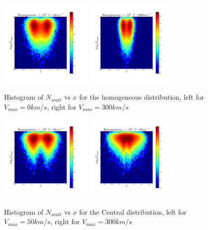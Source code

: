 \documentclass[usenatbib]{mn2e}
\begin{document}
\begin{figure}
     \includegraphics[width=0.40\textwidth]{2dHistogram0t5HOM.png}
     \includegraphics[width=0.40\textwidth]{2dHistogram300t5HOM.png}    
    \caption{Histogram of $N_{scatt}$ vs $x$ for the homogeneous
      distribution, left for $V_{max}=0km/s $, right for
      $V_{max}=300km/s$ \label{fig:NscattHistoHOM}}  
\end{figure}

\begin{figure}
     \includegraphics[width=0.40\textwidth]{2dHistogram50t5.png}
     \includegraphics[width=0.40\textwidth]{2dHistogram300t5.png}    
    \caption{Histogram of $N_{scatt}$ vs $x$ for the Central
      distribution, left for $V_{max}=50km/s $, right for
      $V_{max}=300km/s$ \label{fig:NscattHistoHOM}}  
\end{figure}
\end{document}
